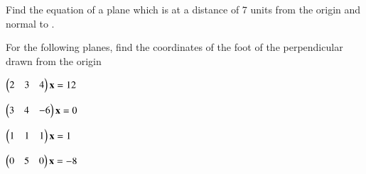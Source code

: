 \solution

\item Find the equation of a plane which is at a distance of 7 units from the origin and normal to .
%
\item  For the following planes, find the coordinates of the foot of the perpendicular drawn from the origin
\begin{enumerate}[itemsep=2pt]
\begin{multicols}{2}
\item
$
\begin{pmatrix}2 & 3 & 4\end{pmatrix}\mathbf{x}=12
$
\item
$
\begin{pmatrix}3 & 4 & -6\end{pmatrix}\mathbf{x}=0
$
\item
$
\begin{pmatrix}1 & 1 & 1\end{pmatrix}\mathbf{x}=1
$
\item
$
\begin{pmatrix}0 & 5 &0\end{pmatrix}\mathbf{x}=-8
$
\end{multicols}
\end{enumerate}

